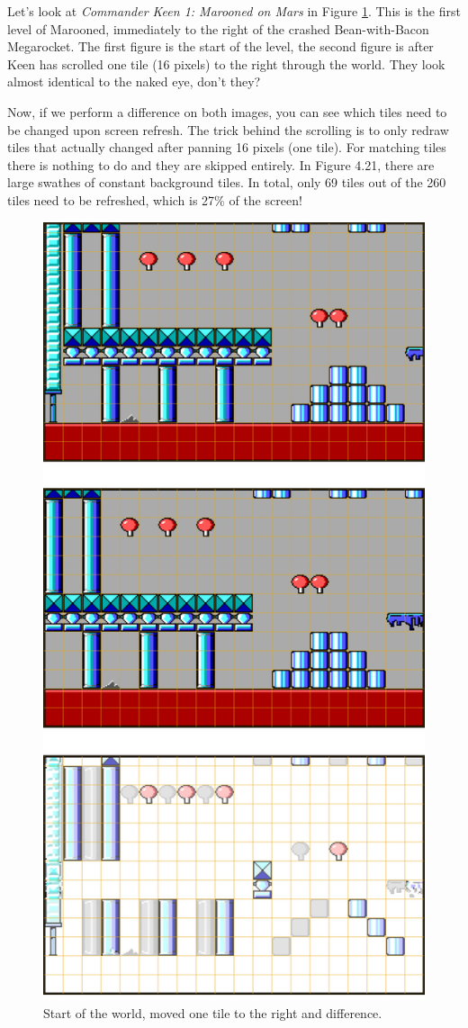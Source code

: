 \documentclass[book.tex]{subfiles}
\begin{document}
\par
Let's look at \textit{Commander Keen 1: Marooned on Mars} in Figure \ref{fig:keen_difference}. This is the first level of Marooned, immediately to the right of the crashed Bean-with-Bacon Megarocket. The first figure is the start of the level, the second figure is after Keen has scrolled one tile (16 pixels) to the right through the world. They look almost identical to the naked eye, don't they? \\

\par
Now, if we perform a difference on both images, you can see which tiles need to be changed upon screen refresh. The trick behind the scrolling is to only redraw tiles that actually changed after panning 16 pixels (one tile). For matching tiles there is nothing to do and they are skipped entirely. In Figure 4.21, there are large swathes of constant background tiles. In total, only 69 tiles out of the 260 tiles need to be refreshed, which is 27\% of the screen!





\pagebreak
\begin{figure}[H] 
  \centering 
  \includegraphics[width=.6\textwidth]{screenshots_300dpi/game/keen-ATR-diff.png}
  \caption{Start of the world, moved one tile to the right and difference.}
  \label{fig:keen_difference}
\end{figure}
\pagebreak
\end{document}
